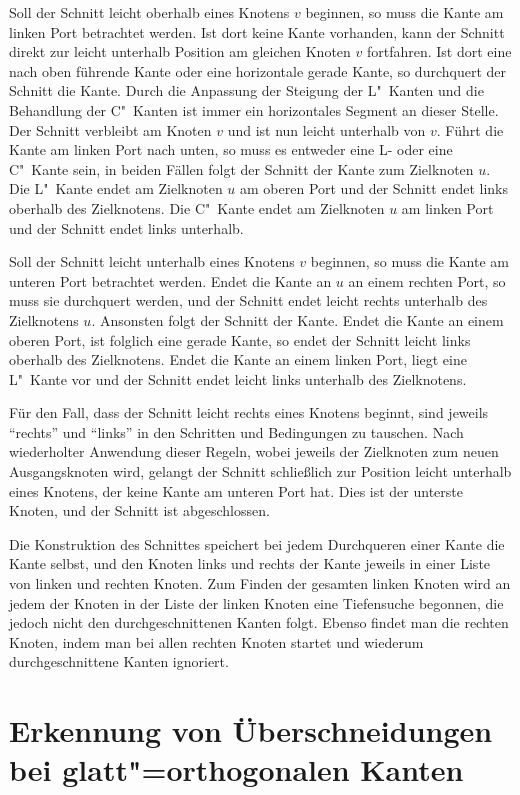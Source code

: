 \documentclass[a4paper]{scrreprt}
\theoremstyle{definition}
\begin{document}
Soll der Schnitt leicht oberhalb eines Knotens $v$ beginnen, so muss die Kante am linken Port betrachtet werden. Ist dort keine Kante vorhanden, kann der Schnitt direkt zur leicht unterhalb Position am gleichen Knoten $v$ fortfahren. Ist dort eine nach oben führende Kante oder eine horizontale gerade Kante, so durchquert der Schnitt die Kante. Durch die Anpassung der Steigung der L"~Kanten und die Behandlung der C"~Kanten ist immer ein horizontales Segment an dieser Stelle. Der Schnitt verbleibt am Knoten $v$ und ist nun leicht unterhalb von $v$. Führt die Kante am linken Port nach unten, so muss es entweder eine L- oder eine C"~Kante sein, in beiden Fällen folgt der Schnitt der Kante zum Zielknoten $u$. Die L"~Kante endet am Zielknoten $u$ am oberen Port und der Schnitt endet links oberhalb des Zielknotens. Die C"~Kante endet am Zielknoten $u$ am linken Port und der Schnitt endet links unterhalb.

Soll der Schnitt leicht unterhalb eines Knotens $v$ beginnen, so muss die Kante am unteren Port betrachtet werden. Endet die Kante an $u$ an einem rechten Port, so muss sie durchquert werden, und der Schnitt endet leicht rechts unterhalb des Zielknotens $u$. Ansonsten folgt der Schnitt der Kante. Endet die Kante an einem oberen Port, ist folglich eine gerade Kante, so endet der Schnitt leicht links oberhalb des Zielknotens. Endet die Kante an einem linken Port, liegt eine L"~Kante vor und der Schnitt endet leicht links unterhalb des Zielknotens.

Für den Fall, dass der Schnitt leicht rechts eines Knotens beginnt, sind jeweils "`rechts"' und "`links"' in den Schritten und Bedingungen zu tauschen. Nach wiederholter Anwendung dieser Regeln, wobei jeweils der Zielknoten zum neuen Ausgangsknoten wird, gelangt der Schnitt schließlich zur Position leicht unterhalb eines Knotens, der keine Kante am unteren Port hat. Dies ist der unterste Knoten, und der Schnitt ist abgeschlossen.

Die Konstruktion des Schnittes speichert bei jedem Durchqueren einer Kante die Kante selbst, und den Knoten links und rechts der Kante jeweils in einer Liste von linken und rechten Knoten. Zum Finden der gesamten linken Knoten wird an jedem der Knoten in der Liste der linken Knoten eine Tiefensuche begonnen, die jedoch nicht den durchgeschnittenen Kanten folgt. Ebenso findet man die rechten Knoten, indem man bei allen rechten Knoten startet und wiederum durchgeschnittene Kanten ignoriert.

\section{Erkennung von Überschneidungen bei glatt"=orthogonalen Kanten}
\end{document}
